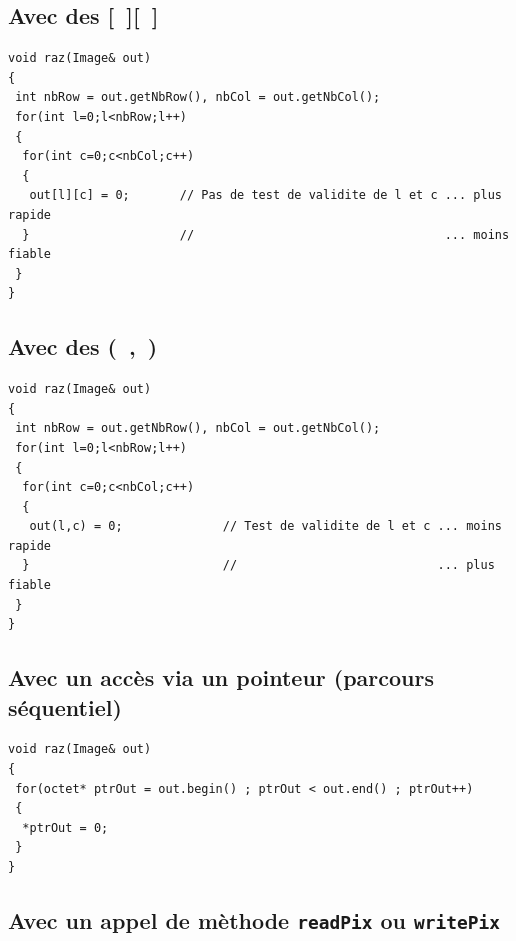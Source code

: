 \documentclass[12pt]{article}
\begin{document}
\vspace{-0.2cm}
\subsection{Avec des [~][~]}

\begin{footnotesize}
\begin{verbatim}
void raz(Image& out)
{
 int nbRow = out.getNbRow(), nbCol = out.getNbCol();
 for(int l=0;l<nbRow;l++)
 {
  for(int c=0;c<nbCol;c++)
  {
   out[l][c] = 0;       // Pas de test de validite de l et c ... plus rapide
  }                     //                                   ... moins fiable
 }
}
\end{verbatim}
\end{footnotesize}

\vspace{-0.3cm}
\subsection{Avec des (~,~)}

\begin{footnotesize}
\begin{verbatim}
void raz(Image& out)
{
 int nbRow = out.getNbRow(), nbCol = out.getNbCol();
 for(int l=0;l<nbRow;l++)
 {
  for(int c=0;c<nbCol;c++)
  {
   out(l,c) = 0;              // Test de validite de l et c ... moins rapide
  }                           //                            ... plus fiable
 }
}
\end{verbatim}
\end{footnotesize}

\vspace{-0.3cm}
\subsection{Avec un acc\`es via un pointeur (parcours s\'equentiel)}

\begin{footnotesize}
\begin{verbatim}
void raz(Image& out)
{
 for(octet* ptrOut = out.begin() ; ptrOut < out.end() ; ptrOut++)
 {
  *ptrOut = 0;
 }
}
\end{verbatim}
\end{footnotesize}

\vspace{-0.3cm}
\subsection{Avec un appel de m\`ethode {\tt readPix} ou {\tt writePix}}
\end{document}
